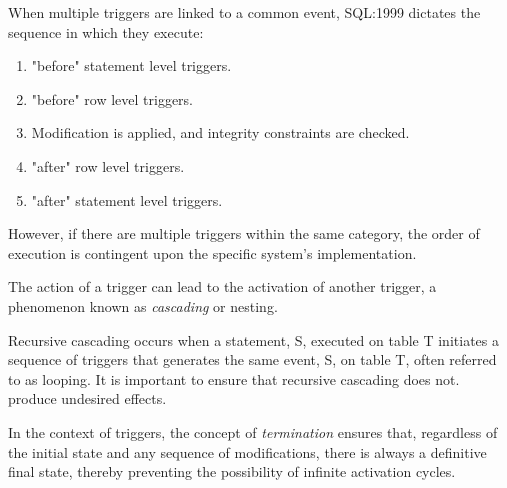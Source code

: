 When multiple triggers are linked to a common event, SQL:1999 dictates the sequence in which they execute: 
\begin{enumerate}
    \item "before" statement level triggers. 
    \item "before" row level triggers. 
    \item Modification is applied, and integrity constraints are checked.
    \item "after" row level triggers. 
    \item "after" statement level triggers.
\end{enumerate}
However, if there are multiple triggers within the same category, the order of execution is contingent upon the specific system's implementation.
\begin{definition}
    The action of a trigger can lead to the activation of another trigger, a phenomenon known as \emph{cascading} or nesting.
\end{definition}
Recursive cascading occurs when a statement, S, executed on table T initiates a sequence of triggers that generates the same event, S, on table T, often referred to as looping.
It is important to ensure that recursive cascading does not. produce undesired effects. 
\begin{definition}
    In the context of triggers, the concept of \emph{termination} ensures that, regardless of the initial state and any sequence of modifications, there is always a definitive final state, thereby preventing the possibility of infinite activation cycles.
\end{definition}

